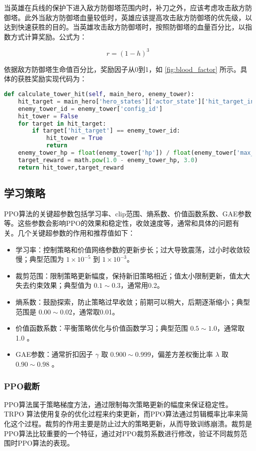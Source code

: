 当英雄在兵线的保护下进入敌方防御塔范围内时，补刀之外，应该考虑攻击敌方防御塔。此外当敌方防御塔血量较低时，英雄应该提高攻击敌方防御塔的优先级，以达到快速获胜的目的。当英雄攻击敌方防御塔时，按照防御塔的血量百分比，以指数方式计算奖励。公式为：

\begin{equation}
    r = (1 - h) ^ {3}
\end{equation}

依据敌方防御塔生命值百分比，奖励因子从0到1，如 \cref{fig:blood_factor} 所示。具体的获胜奖励实现代码为：

\begin{lstlisting}[language=Python]
def calculate_tower_hit(self, main_hero, enemy_tower):
    hit_target = main_hero['hero_states']['actor_state']['hit_target_info']
    enemy_tower_id = enemy_tower['config_id']
    hit_tower = False
    for target in hit_target:
        if target['hit_target'] == enemy_tower_id:
            hit_tower = True
            return
    enemy_tower_hp = float(enemy_tower['hp']) / float(enemy_tower['max_hp'])
    target_reward = math.pow(1.0 - enemy_tower_hp, 3.0)
    return hit_tower,target_reward
\end{lstlisting}

\subsection{学习策略}
PPO算法的关键超参数包括学习率、clip范围、熵系数、价值函数系数、GAE参数等。这些参数会影响PPO的效果和稳定性，收敛速度等，通常和具体的问题有关。几个关键超参数的作用和推荐值如下：
\begin{itemize}
    \item 学习率：控制策略和价值网络参数的更新步长；过大导致震荡，过小时收敛较慢；典型范围为 $1 \times 10^{-5}$ 到 $1 \times 10^{-3}$。
    \item 裁剪范围：限制策略更新幅度，保持新旧策略相近；值太小限制更新，值太大失去约束效果；典型值为 $0.1 \sim 0.3$，通常用0.2。
    \item 熵系数：鼓励探索，防止策略过早收敛；前期可以稍大，后期逐渐缩小；典型范围是 $0.00 \sim 0.02$，通常取0.01。
    \item 价值函数系数：平衡策略优化与价值函数学习；典型范围 $0.5 \sim 1.0$，通常取1.0 。
    \item GAE参数：通常折扣因子 $\gamma$ 取 $0.900 \sim 0.999$，偏差\-方差权衡比率 $\lambda$ 取 $0.90 \sim 0.98$ 。
\end{itemize}

\subsubsection{PPO截断}
PPO算法属于策略梯度方法，通过限制每次策略更新的幅度来保证稳定性。TRPO 算法使用复杂的优化过程来约束更新，而PPO算法通过剪辑概率比率来简化这个过程。裁剪的作用主要是防止过大的策略更新，从而导致训练崩溃。裁剪是PPO算法比较重要的一个特征，通过对PPO裁剪系数进行修改，验证不同裁剪范围时PPO算法的表现。


